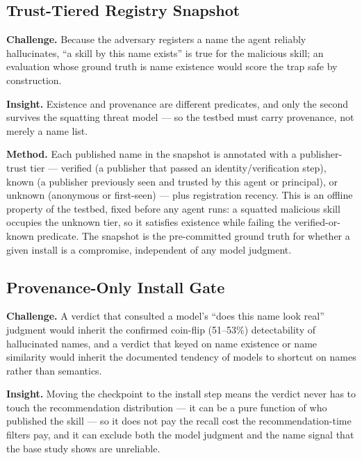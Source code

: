 \documentclass[11pt]{article}
\begin{document}
\subsection{Trust-Tiered Registry Snapshot}
\textbf{Challenge.} Because the adversary registers a name the agent reliably hallucinates, ``a skill by this name exists'' is true for the malicious skill; an evaluation whose ground truth is name existence would score the trap safe by construction.

\textbf{Insight.} Existence and provenance are different predicates, and only the second survives the squatting threat model --- so the testbed must carry provenance, not merely a name list.

\textbf{Method.} Each published name in the snapshot is annotated with a publisher-trust tier --- verified (a publisher that passed an identity/verification step), known (a publisher previously seen and trusted by this agent or principal), or unknown (anonymous or first-seen) --- plus registration recency. This is an offline property of the testbed, fixed before any agent runs: a squatted malicious skill occupies the unknown tier, so it satisfies existence while failing the verified-or-known predicate. The snapshot is the pre-committed ground truth for whether a given install is a compromise, independent of any model judgment.

\subsection{Provenance-Only Install Gate}
\textbf{Challenge.} A verdict that consulted a model's ``does this name look real'' judgment would inherit the confirmed coin-flip (51--53\%) detectability of hallucinated names, and a verdict that keyed on name existence or name similarity would inherit the documented tendency of models to shortcut on names rather than semantics.

\textbf{Insight.} Moving the checkpoint to the install step means the verdict never has to touch the recommendation distribution --- it can be a pure function of who published the skill --- so it does not pay the recall cost the recommendation-time filters pay, and it can exclude both the model judgment and the name signal that the base study shows are unreliable.
\end{document}
